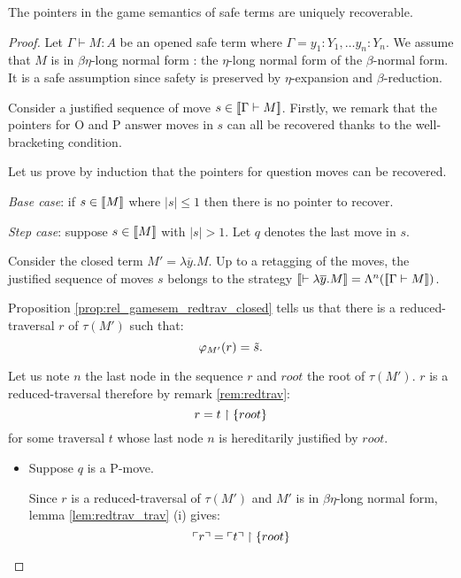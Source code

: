\begin{prop}
The pointers in the game semantics of safe terms are
uniquely recoverable.
\end{prop}

\begin{proof}
Let $\Gamma \vdash M : A$ be an opened safe term where $\Gamma = y_1:Y_1, \ldots y_n:Y_n$.
We assume that $M$ is in $\beta \eta$-long normal form : the $\eta$-long normal form of the $\beta$-normal form.
It is a safe assumption since safety is preserved by $\eta$-expansion and $\beta$-reduction.

Consider a justified sequence of move $s \in {[\![\Gamma \vdash M ]\!]}$. Firstly,
we remark that the pointers for O and P answer moves in $s$ can all be
recovered thanks to the well-bracketing condition.

Let us prove by induction that the pointers for question moves can be recovered.

\emph{Base case}: if $s \in {[\![M ]\!]}$ where $|s| \leq 1$ then there is no pointer to recover.

\emph{Step case}: suppose $s \in {[\![M ]\!]}$ with $|s| > 1$. Let $q$ denotes the last move in $s$.

Consider the closed term $M'  = \lambda \overline{y} . M$.
Up to a retagging of the moves, the justified sequence of moves $s$ belongs to the strategy
${[\![ \vdash \lambda \overline{y} . M ]\!]} = \Lambda^n({[\![ \Gamma \vdash M ]\!]})$.

Proposition \ref{prop:rel_gamesem_redtrav_closed} tells us that
there is a reduced-traversal $r$ of $\tau(M')$ such that:
$$\varphi_{M'}(r) = \tilde{s}.$$

Let us note $n$ the last node in the sequence $r$
and $root$ the root of $\tau(M')$.
$r$ is a reduced-traversal therefore by remark \ref{rem:redtrav}:
$$ r = t \upharpoonright \{ root \} $$
for some traversal $t$ whose last node $n$ is hereditarily justified by $root$.

\begin{itemize}
\item Suppose $q$ is a P-move.

Since $r$ is a reduced-traversal of $\tau(M')$ and $M'$ is in $\beta
\eta$-long normal form, lemma \ref{lem:redtrav_trav} (i) gives:
\begin{equation}
 \ulcorner r \urcorner = \ulcorner t \urcorner \upharpoonright \{ root \} \label{eq:pre_pview_r}
\end{equation}



\end{itemize}
\end{proof}
